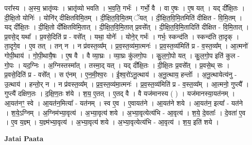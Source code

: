 \documentclass[17pt]{extarticle}
\begin{document}
परा᳚स्य । अ॒स्य॒ भ्रातृ॑व्यः । भ्रातृ॑व्यो भवति । भ॒व॒ति॒ गर्भः॑ । गर्भो॒ वै । वा ए॒षः । ए॒ष यत् । यद् दी᳚क्षि॒तः । दी॒क्षि॒तो योनिः॑ । योनि॑र् दीक्षितविमि॒तम् । दी॒क्षि॒त॒वि॒मि॒तम् ॅयत् । दी॒क्षि॒त॒वि॒मि॒तमिति॑ दीक्षित - वि॒मि॒तम् । यद् दी᳚क्षि॒तः । दी॒क्षि॒तो दी᳚क्षितविमि॒तात् । दी॒क्षि॒त॒वि॒मि॒तात् प्र॒वसे᳚त् । दी॒क्षि॒त॒वि॒मि॒तादिति॑ दीक्षित - वि॒मि॒तात् । प्र॒वसे॒द् यथा᳚ । प्र॒वसे॒दिति॑ प्र - वसे᳚त् । यथा॒ योनेः᳚ । योने॒र् गर्भः॑ । गर्भः॒ स्कन्द॑ति । स्कन्द॑ति ता॒दृक् । ता॒दृगे॒व । ए॒व तत् । तन् न । न प्र॑वस्त॒व्य᳚म् । प्र॒व॒स्त॒व्य॑मा॒त्मनः॑ । प्र॒व॒स्त॒व्य॑मिति॑ प्र - व॒स्त॒व्य᳚म् । आ॒त्मनो॑ गोपी॒थाय॑ । गो॒पी॒थायै॒षः । ए॒ष वै । वै व्या॒घ्रः । व्या॒घ्रः कु॑लगो॒पः । कु॒ल॒गो॒पो यत् । कु॒ल॒गो॒प इति॑ कुल - गो॒पः । यद॒ग्निः । अ॒ग्निस्तस्मा᳚त् । तस्मा॒द् यत् । यद् दी᳚क्षि॒तः । दी॒क्षि॒तः प्र॒वसे᳚त् । प्र॒वसे॒थ् सः । प्र॒वसे॒दिति॑ प्र - वसे᳚त् । स ए॑नम् । ए॒न॒मी॒श्व॒रः । ई॒श्व॒रो॑ऽनू॒त्थाय॑ । अ॒नू॒त्थाय॒ हन्तोः᳚ । अ॒नू॒त्थायेत्य॑नु - उ॒त्थाय॑ । हन्तो॒र् न । न प्र॑वस्त॒व्य᳚म् । प्र॒व॒स्त॒व्य॑मा॒त्मनः॑ । प्र॒व॒स्त॒व्य॑मिति॑ प्र - व॒स्त॒व्य᳚म् । आ॒त्मनो॒ गुप्त्यै᳚ । गुप्त्यै॑ दक्षिण॒तः । द॒क्षि॒ण॒तः श॑ये । श॒य॒ ए॒तत् । ए॒तद् वै । वै यज॑मानस्य ( ) । यज॑मानस्या॒यत॑नम् । आ॒यत॑नꣳ॒॒ स्वे । आ॒यत॑न॒मित्या᳚ - यत॑नम् । स्व ए॒व । ए॒वायत॑ने । आ॒यत॑ने शये । आ॒यत॑न॒ इत्या᳚ - यत॑ने । श॒ये॒ऽग्निम् । अ॒ग्निम॑भ्या॒वृत्य॑ । अ॒भ्या॒वृत्य॑ शये । अ॒भ्या॒वृत्येत्य॑भि - आ॒वृत्य॑ । श॒ये॒ दे॒वताः᳚ । दे॒वता॑ ए॒व । ए॒व य॒ज्ञ्म् । य॒ज्ञ्म॑भ्या॒वृत्य॑ । अ॒भ्या॒वृत्य॑ शये । अ॒भ्या॒वृत्येत्य॑भि - आ॒वृत्य॑ । श॒य॒ इति॑ शये । \newline

\textbf{Jatai Paata} \newline
\end{document}
